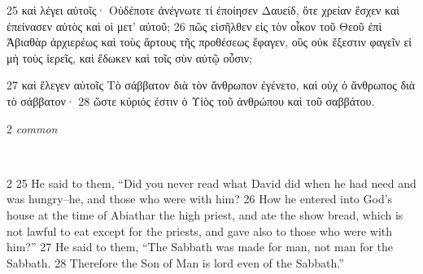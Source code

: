 \documentclass[10pt,a5paper,twoside,twocolumn]{book}
\newcommand*\cleartoleftpage{%
  \ifodd\value{page}\hbox{}\clearpage\fi
}
\newcommand{\separator}{\hspace{0.27\textwidth}\noindent\makebox[\linewidth]{\resizebox{0.3333\linewidth}{1pt}{$\bullet$}}\bigskip}
\newenvironment{facing}{\cleartoleftpage}{\clearpage\pagebreak}
\newenvironment{help}{\pagebreak}{}
\newenvironment{helpsec}{\begin{minipage}[t]{\textwidth}\begin{multicols}{2}}{\end{multicols}\end{minipage}}
\newenvironment{vocab}{\begin{helpsec}}{\end{helpsec}}
\newenvironment{translation}{\separator\\\begin{helpsec}\footnotesize}{\end{helpsec}}
\begin{document}
\begin{facing}
25 καὶ λέγει αὐτοῖς· Οὐδέποτε ἀνέγνωτε τί ἐποίησεν Δαυείδ, ὅτε χρείαν ἔσχεν καὶ ἐπείνασεν αὐτὸς καὶ οἱ μετ’ αὐτοῦ; 26 πῶς εἰσῆλθεν εἰς τὸν οἶκον τοῦ Θεοῦ ἐπὶ Ἀβιαθὰρ ἀρχιερέως καὶ τοὺς ἄρτους τῆς προθέσεως ἔφαγεν, οὓς οὐκ ἔξεστιν φαγεῖν εἰ μὴ τοὺς ἱερεῖς, καὶ ἔδωκεν καὶ τοῖς σὺν αὐτῷ οὖσιν; 

27 καὶ ἔλεγεν αὐτοῖς Τὸ σάββατον διὰ τὸν ἄνθρωπον ἐγένετο, καὶ οὐχ ὁ ἄνθρωπος διὰ τὸ σάββατον· 28 ὥστε κύριός ἐστιν ὁ Υἱὸς τοῦ ἀνθρώπου καὶ τοῦ σαββάτου.

\begin{help}
\begin{vocab}
\emph{common}\\

\end{vocab}
\begin{translation}
 25 He said to them, ``Did you never read what David did when he had need and was hungry--he, and those who were with him? 26  How he entered into God's house at the time of Abiathar the high priest, and ate the show bread, which is not lawful to eat except for the priests, and gave also to those who were with him?''
27 He said to them, ``The Sabbath was made for man, not man for the Sabbath. 28  Therefore the Son of Man is lord even of the Sabbath.''
\end{translation}
\end{help}
\end{facing}


\sloppypar
\end{document}
